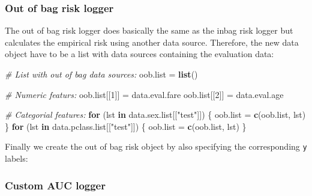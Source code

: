 \documentclass[]{article}
\newenvironment{Shaded}{\begin{snugshade}}{\end{snugshade}}
\newcommand{\KeywordTok}[1]{\textcolor[rgb]{0.13,0.29,0.53}{\textbf{#1}}}
\newcommand{\DataTypeTok}[1]{\textcolor[rgb]{0.13,0.29,0.53}{#1}}
\newcommand{\DecValTok}[1]{\textcolor[rgb]{0.00,0.00,0.81}{#1}}
\newcommand{\FloatTok}[1]{\textcolor[rgb]{0.00,0.00,0.81}{#1}}
\newcommand{\StringTok}[1]{\textcolor[rgb]{0.31,0.60,0.02}{#1}}
\newcommand{\CommentTok}[1]{\textcolor[rgb]{0.56,0.35,0.01}{\textit{#1}}}
\newcommand{\OtherTok}[1]{\textcolor[rgb]{0.56,0.35,0.01}{#1}}
\newcommand{\ControlFlowTok}[1]{\textcolor[rgb]{0.13,0.29,0.53}{\textbf{#1}}}
\newcommand{\OperatorTok}[1]{\textcolor[rgb]{0.81,0.36,0.00}{\textbf{#1}}}
\newcommand{\NormalTok}[1]{#1}
\begin{document}
\subsubsection{Out of bag risk logger}\label{out-of-bag-risk-logger}

The out of bag risk logger does basically the same as the inbag risk
logger but calculates the empirical risk using another data source.
Therefore, the new data object have to be a list with data sources
containing the evaluation data:

\begin{Shaded}
\begin{Highlighting}[]
\CommentTok{# List with out of bag data sources:}
\NormalTok{oob.list =}\StringTok{ }\KeywordTok{list}\NormalTok{()}

\CommentTok{# Numeric featurs:}
\NormalTok{oob.list[[}\DecValTok{1}\NormalTok{]] =}\StringTok{ }\NormalTok{data.eval.fare}
\NormalTok{oob.list[[}\DecValTok{2}\NormalTok{]] =}\StringTok{ }\NormalTok{data.eval.age}

\CommentTok{# Categorial features:}
\ControlFlowTok{for}\NormalTok{ (lst }\ControlFlowTok{in}\NormalTok{ data.sex.list[[}\StringTok{"test"}\NormalTok{]]) \{}
\NormalTok{  oob.list =}\StringTok{ }\KeywordTok{c}\NormalTok{(oob.list, lst)}
\NormalTok{\}}
\ControlFlowTok{for}\NormalTok{ (lst }\ControlFlowTok{in}\NormalTok{ data.pclass.list[[}\StringTok{"test"}\NormalTok{]]) \{}
\NormalTok{  oob.list =}\StringTok{ }\KeywordTok{c}\NormalTok{(oob.list, lst)}
\NormalTok{\}}
\end{Highlighting}
\end{Shaded}

Finally we create the out of bag risk object by also specifying the
corresponding \texttt{y} labels:

\begin{Shaded}
\end{Shaded}

\subsubsection{Custom AUC logger}\label{custom-auc-logger}
\end{document}

